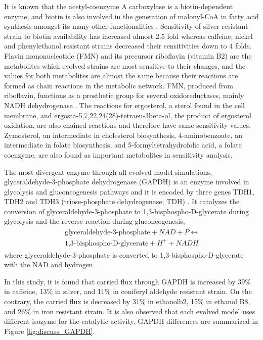 It is known that the acetyl-coenzyme A carboxylase is a biotin-dependent enzyme, and biotin is also involved in the generation of malonyl-CoA in fatty acid synthesis amongst its many other functionalities \cite{hasslacher1993acetyl, morris1987yeast}. Sensitivity of silver resistant strain to biotin availability has increased almost 2.5 fold whereas caffeine, nickel and phenylethanol resistant strains decreased their sensitivities down to 4 folds. Flavin mononucleotide (FMN) and its precursor riboflavin (vitamin B2) are the metabolites which evolved strains are most sensitive to their changes, and the values for both metabolites are almost the same because their reactions are formed as chain reactions in the metabolic network. FMN, produced from riboflavin, functions as a prosthetic group for several oxidoreductases, mainly NADH dehydrogenase \cite{tsibris1966studies}. The reactions for ergosterol, a sterol found in the cell membrane, and ergosta-5,7,22,24(28)-tetraen-3beta-ol, the product of ergosterol oxidation, are also chained reactions and therefore have same sensitivity values. Zymosterol, an intermediate in cholesterol biosynthesis, 4-aminobenzoate, an intermediate in folate biosynthesis, and 5-formyltetrahydrofolic acid, a folate coenzyme, are also found as important metabolites in sensitivity analysis.

The most divergent enzyme through all evolved model simulations, glyceraldehyde-3-phosphate dehydrogenase (GAPDH) is an enzyme involved in glycolysis and gluconeogenesis pathways and it is encoded by three genes TDH1, TDH2 and TDH3 (triose-phosphate dehydrogenase; TDH) \cite{boucherie1995differential}. It catalyzes the conversion of glyceraldehyde-3-phosphate to 1,3-bisphospho-D-glycerate during glycolysis and the reverse reaction during gluconeogenesis,
\begin{align}
\begin{split}
\ \text{glyceraldehyde-3-phosphate} + NAD + P \leftrightarrow \\
\ \text{1,3-bisphospho-D-glycerate} + H^+ + NADH
\end{split}
\end{align}
where glyceraldehyde-3-phosphate is converted to 1,3-bisphospho-D-glycerate with the NAD and hydrogen.


In this study, it is found that carried flux through GAPDH is increased by 39\% in caffeine, 13\% in silver, and 11\% in coniferyl aldehyde resistant strain. On the contrary, the carried flux is decreased by 31\% in ethanolb2, 15\% in ethanol B8, and 26\% in iron resistant strain. It is also observed that each evolved model uses different isozyme for the catalytic activity. GAPDH differences are summarized in Figure \ref{fig:discuss_GAPDH}.

